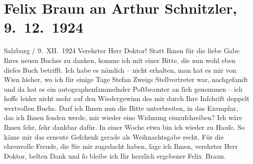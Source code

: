 

         
         \renewcommand{\erwaehntePersonen}{Personen: Stefan Zweig}
         \renewcommand{\erwaehnteOrte}{Orte: Salzburg, Wien}
         \renewcommand{\erwaehnteWerke}{Werke: Fräulein Else}
               \section[Felix Braun an Arthur Schnitzler, 9. 12. 1924]{ Felix Braun an Arthur Schnitzler, 9. 12. 1924}\nopagebreak{}\rehead{ }\begin{ledgroupsized}[t]{13cm}\normalsize\beginnumbering \toendnotes[C]{\smallbreak\pagebreak[2]} 
\toendnotes[C]{\smallbreak}\pstart
           \centering{}{\pb}Salzburg / 9. XII. 1924\pend
           \pstart{}Verehrter Herr Doktor!\pend\pstart
           Statt Ihnen für die liebe Gabe Ihres neuen Buches zu danken, komme ich mit einer Bitte, die nun wohl
               eben dieſes Buch betrifft. Ich
               habe es nämlich – nicht erhalten, man hat es mir von Wien hieher, wo ich für einige Tage Stefan
                  Zweigs Stellvertreter war, nachgeſandt und da hat es ein
               autographenſammelnder Poſtbeamter an ſich genommen – ich hoffe leider nicht mehr auf
               den Wiedergewinn des mir durch Ihre Inſchrift doppelt wertvollen Buchs. Darf ich Ihnen nun die Bitte
               unterbreiten, in das Exemplar, das ich Ihnen ſenden werde, mir wieder eine Widmung
               einzuſchreiben? Ich wäre Ihnen ſehr, ſehr dankbar dafür. In einer Woche etwa bin ich
               wieder zu Hauſe. {\pb}So käme mir das erneute Geſchenk
               gerade als Weihnachtsgabe recht.\pend
           \pstart
           Für die ehrenvolle Freude, die Sie mir zugedacht haben, ſage ich Ihnen, verehrter
               Herr Doktor, beſten Dank und ſo bleibe ich Ihr herzlich ergebener\pend
           \pstart \spacefill\mbox{Felix Braun.}\pend{}
         

\end{ledgroupsized}
